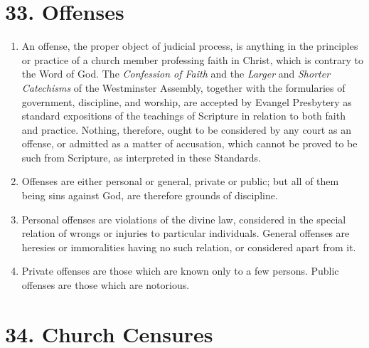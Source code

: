 \documentclass[
]{book}
\providecommand{\tightlist}{%
  \setlength{\itemsep}{0pt}\setlength{\parskip}{0pt}}
\begin{document}
\hypertarget{offenses}{%
\section*{33. Offenses}\label{offenses}}

\protect\hypertarget{chapter-slug-33-offenses}{\href{}{}}

\begin{enumerate}
\def\labelenumi{\arabic{enumi}.}
\tightlist
\item
  \protect\hypertarget{33}{\href{}{}}\protect\hypertarget{33.1}{\href{}{}}An offense, the proper object of judicial process, is anything in the principles or practice of a church member professing faith in Christ, which is contrary to the Word of God. The \emph{Confession of Faith} and the \emph{Larger} and \emph{Shorter Catechisms} of the Westminster Assembly, together with the formularies of government, discipline, and worship, are accepted by Evangel Presbytery as standard expositions of the teachings of Scripture in relation to both faith and practice. Nothing, therefore, ought to be considered by any court as an offense, or admitted as a matter of accusation, which cannot be proved to be such from Scripture, as interpreted in these Standards.
\item
  Offenses are either personal or general, private or public; but all of them being sins against God, are therefore grounds of discipline.
\item
  Personal offenses are violations of the divine law, considered in the special relation of wrongs or injuries to particular individuals. General offenses are heresies or immoralities having no such relation, or considered apart from it.
\item
  Private offenses are those which are known only to a few persons. Public offenses are those which are notorious.
\end{enumerate}

\hypertarget{church-censures}{%
\section*{34. Church Censures}\label{church-censures}}

\protect\hypertarget{chapter-slug-34-church-censures}{\href{}{}}
\end{document}
